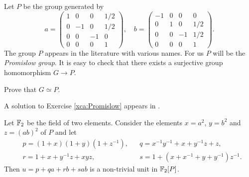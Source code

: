 Let $P$ be the group
generated by
\[
a=\begin{pmatrix}
1 & 0 & 0 & 1/2\\
0 & -1 & 0 & 1/2\\
0 & 0 & -1 & 0\\
0 & 0 & 0 & 1
\end{pmatrix},
\quad
b=\begin{pmatrix}
-1 & 0 & 0 & 0\\
0 & 1 & 0 & 1/2\\
0 & 0 & -1 & 1/2\\
0 & 0 & 0 & 1
\end{pmatrix}. 
\]
The group $P$ appears in the literature with various names. 
For us $P$ will be the \emph{Promislow group}. 
It is easy to check
that there exists a surjective group homomorphism $G\to P$. 

\begin{exercise}
\label{xca:Promislow}
    Prove that $G\simeq P$.   
\end{exercise}

A solution to Exercise \ref{xca:Promislow} appears 
in \cite{MR798076}. 

\begin{theorem}[Gardam]
\label{thm:Gardam}
    Let $\mathbb{F}_2$ be the field of two elements. Consider the elements 
    $x=a^2$, $y=b^2$ and $z=(ab)^2$ of $P$ and let 
    \begin{align*}
        &p=(1+x)(1+y)(1+z^{-1}), 
        &&q = x^{-1}y^{-1}+x+y^{-1}z+z,\\
        &r = 1+x+y^{-1}z+xyz,
        &&s=1+(x+x^{-1}+y+y^{-1})z^{-1}.
    \end{align*}
    Then $u=p+qa+rb+sab$ is a non-trivial unit in $\mathbb{F}_2[P]$. 
\end{theorem}

